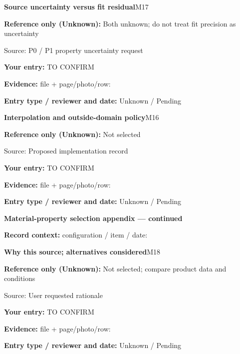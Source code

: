 \documentclass[11pt]{article}
\begin{document}
\begin{minipage}{\textwidth}\small
{\color{navy}\bfseries Source uncertainty versus fit residual}\hfill M17\par
\colorbox{pale}{\parbox{\dimexpr\linewidth-2\fboxsep\relax}{
\textbf{Reference only (Unknown):} Both unknown; do not treat fit precision as uncertainty\par
{\footnotesize Source: P0 / P1 property uncertainty request}}}\par
\textbf{Your entry:} {\color{muted}TO CONFIRM}\enspace\hrulefill\par
{\footnotesize\textbf{Evidence:} file + page/photo/row: \hrulefill\par
\textbf{Entry type / reviewer and date:} Unknown / Pending\par
}\end{minipage}\par\vspace{5pt}
\begin{minipage}{\textwidth}\small
{\color{navy}\bfseries Interpolation and outside-domain policy}\hfill M16\par
\colorbox{pale}{\parbox{\dimexpr\linewidth-2\fboxsep\relax}{
\textbf{Reference only (Unknown):} Not selected\par
{\footnotesize Source: Proposed implementation record}}}\par
\textbf{Your entry:} {\color{muted}TO CONFIRM}\enspace\hrulefill\par
{\footnotesize\textbf{Evidence:} file + page/photo/row: \hrulefill\par
\textbf{Entry type / reviewer and date:} Unknown / Pending\par
}\end{minipage}\par\vspace{5pt}
\clearpage
{\large\bfseries Material-property selection appendix --- continued}\par
\textbf{Record context:} configuration / item / date: \hrulefill\par
\begin{minipage}{\textwidth}\small
{\color{navy}\bfseries Why this source; alternatives considered}\hfill M18\par
\colorbox{pale}{\parbox{\dimexpr\linewidth-2\fboxsep\relax}{
\textbf{Reference only (Unknown):} Not selected; compare product data and conditions\par
{\footnotesize Source: User requested rationale}}}\par
\textbf{Your entry:} {\color{muted}TO CONFIRM}\enspace\hrulefill\par
{\footnotesize\textbf{Evidence:} file + page/photo/row: \hrulefill\par
\textbf{Entry type / reviewer and date:} Unknown / Pending\par
}\end{minipage}\par\vspace{5pt}
\end{document}
